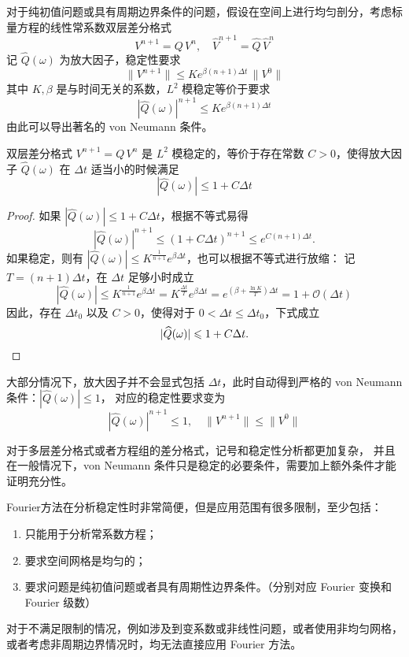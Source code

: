 对于纯初值问题或具有周期边界条件的问题，假设在空间上进行均匀剖分，考虑标量方程的线性常系数双层差分格式
\[
    V^{n+1} = Q \, V^n,\quad \widehat{V}^{n+1} = \widehat{Q} \, \widehat{V}^n
\]
记 $\widehat{Q}(\omega)$ 为放大因子，稳定性要求
\[
    \| V^{n+1}\|\le K e^{\beta(n+1)\Delta t} \,\| V^0\|
\]
其中 $K,\beta$ 是与时间无关的系数，$L^2$ 模稳定等价于要求
\[
    |\widehat{Q}(\omega)|^{n+1} \le K e^{\beta(n+1)\Delta t}
\]
由此可以导出著名的 von Neumann 条件。

\begin{theorem}
    双层差分格式 $V^{n+1} = Q \, V^n$ 是 $L^2$ 模稳定的，等价于存在常数 $C>0$，使得放大因子 $\widehat{Q}(\omega)$ 在 $\Delta t$ 适当小的时候满足
    \[
        |\widehat{Q}(\omega)| \le 1+C \Delta t
    \]
\end{theorem}

\begin{proof}
    如果 $|\widehat{Q}(\omega)| \le 1 + C \Delta t$，根据不等式易得
    \[
        |\widehat{Q}(\omega)|^{n+1} \le (1 + C \Delta t)^{n+1} \le e^{C (n+1)\Delta t}.
    \]
    如果稳定，则有 $|\widehat{Q}(\omega)|  \le K^{\frac{1}{n+1}} e^{\beta \Delta t}$，也可以根据不等式进行放缩：
    记 $T = (n+1)\Delta t$，在 $\Delta t$ 足够小时成立
    \[
        |\widehat{Q}(\omega)|  \le K^{\frac{1}{n+1}} e^{\beta \Delta t}
        = K^{\frac{\Delta t}{T}} e^{\beta \Delta t}
        = e^{(\beta + \frac{\ln K}{T})\Delta t}
        = 1 + \mathcal{O}(\Delta t)
    \]
    因此，存在 $\Delta t_0$ 以及 $C>0$，使得对于 $0 < \Delta t \le \Delta t_0$，下式成立
    \[
        |\widehat{Q}(\omega)| \le 1+C \Delta t. \qedhere
    \]
\end{proof}

\begin{remark}
    大部分情况下，放大因子并不会显式包括 $\Delta t$，此时自动得到严格的 von Neumann 条件：$|\widehat{Q}(\omega)| \le 1$，
    对应的稳定性要求变为
    \[
        |\widehat{Q}(\omega)|^{n+1} \le 1,\quad
        \| V^{n+1}\|\le  \| V^0\|
    \]
\end{remark}

\begin{remark}
    对于多层差分格式或者方程组的差分格式，记号和稳定性分析都更加复杂，
    并且在一般情况下，von Neumann 条件只是稳定的必要条件，需要加上额外条件才能证明充分性。
\end{remark}

Fourier方法在分析稳定性时非常简便，但是应用范围有很多限制，至少包括：
\begin{enumerate}
    \item 只能用于分析常系数方程；
    \item 要求空间网格是均匀的；
    \item 要求问题是纯初值问题或者具有周期性边界条件。（分别对应 Fourier 变换和 Fourier 级数）
\end{enumerate}
对于不满足限制的情况，例如涉及到变系数或非线性问题，或者使用非均匀网格，或者考虑非周期边界情况时，均无法直接应用 Fourier 方法。

